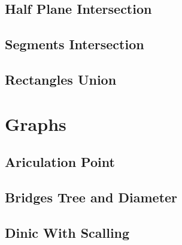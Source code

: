 \subsection{Half Plane Intersection}
\vspace{-2.3ex}
\raggedbottom
\vspace{-3.3ex}
\hrulefill
\vspace{-1ex}
\subsection{Segments Intersection}
\vspace{-2.3ex}
\raggedbottom
\vspace{-3.3ex}
\hrulefill
\vspace{-1ex}
\subsection{Rectangles Union}
\vspace{-2.3ex}
\raggedbottom
\vspace{-3.3ex}
\hrulefill

\section{Graphs}
\vspace{-1ex}
\subsection{Ariculation Point}
\vspace{-2.3ex}
\raggedbottom
\vspace{-3.3ex}
\hrulefill
\vspace{-1ex}
\subsection{Bridges Tree and Diameter}
\vspace{-2.3ex}
\raggedbottom
\vspace{-3.3ex}
\hrulefill
\vspace{-1ex}
\subsection{Dinic With Scalling}
\vspace{-2.3ex}
\raggedbottom
\vspace{-3.3ex}
\hrulefill
\vspace{-1ex}
